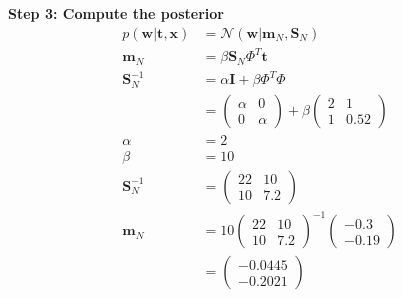 \documentclass[paper=a4, fontsize=10pt]{scrartcl} %
\numberwithin{equation}{section} %
\numberwithin{figure}{section} %
\numberwithin{table}{section} %
\begin{document}
\begin{enumerate}
			\textbf{Step 3: Compute the posterior}
			\begin{align}
				p(\boldsymbol w \vert \boldsymbol t, \boldsymbol x) &= \mathcal{N}(\boldsymbol w \vert \boldsymbol m_N, \boldsymbol S_N)\\
				\boldsymbol m_N &= \beta \boldsymbol S_N \Phi^T \boldsymbol t\\
				\boldsymbol S_N^{-1} &= \alpha \boldsymbol I + \beta \Phi^T\Phi\\
								 &= \begin{pmatrix}
								 		\alpha & 0\\
								 		0 & \alpha
								 	\end{pmatrix} + 
								 	\beta \begin{pmatrix}
								 				2 & 1\\
								 				1 & 0.52
								 		  \end{pmatrix}\\
				\alpha &= 2\\
				\beta &= 10\\
				\boldsymbol S_N^{-1} &= \begin{pmatrix}
											22 & 10\\
											10 & 7.2
										  \end{pmatrix}\\
				\boldsymbol m_N &= 10 \begin{pmatrix}
											22 & 10\\
											10 & 7.2
										\end{pmatrix}^{-1}
										\begin{pmatrix}
											-0.3\\
											-0.19
										\end{pmatrix}\\
								 &= \begin{pmatrix}
								 		-0.0445\\
								 		-0.2021
								 	\end{pmatrix}
			\end{align}


\end{enumerate}
\end{document}
